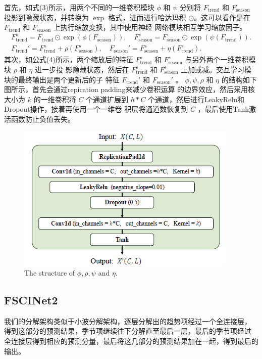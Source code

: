 \documentclass[twoside,a4paper]{article}
\begin{document}
\begin{CJK*}{UTF8}{gkai}
首先，如式(3)所示，用两个不同的一维卷积模块 $\phi$ 和 $\psi$ 分别将
$F_{\text{trend}}$ 和 $F_{\text{season}}$ 投影到隐藏状态，并转换为
$\exp$ 格式，进而进行哈达玛积 $\odot$。这可以看作是在
$F_{\text{trend}}$ 和 $F_{\text{season}}$ 上执行缩放变换，其中使用神经
网络模块相互学习缩放因子。
\begin{gather}
  F_{\text{trend}}^s=F_{\text{trend}}\odot \exp(\phi(F_{\text{season}})),\quad F_{\text{season}}^s=F_{\text{season}}\odot \exp(\psi(F_{\text{trend}})).\\
F_{\text{trend}}'=F_{\text{trend}}^s+\rho(F_{\text{season}}^s),\quad F_{\text{season}}'=F_{\text{season}}^s+\eta(F_{\text{trend}}^s).
\end{gather}
其次，如公式(4)所示，两个缩放后的特征 $F_{\text{trend}}^s$ 和
$F_{\text{season}}^s$ 与另外两个一维卷积模块 $\rho$ 和 $\eta$ 进一步投
影隐藏状态，然后在 $F_{\text{trend}}^s$ 和
$F_{\text{season}}^s$ 上加或减。交互学习模块的最终输出是两个更新后的子
特征 $F_{\text{trend}}'$ 和 $F_{\text{season}}'$ 。 $\phi ,\psi,\rho$
和 $\eta$ 的结构如下图所示，首先会通过repication padding来减少卷积运算
的边界效应，然后采用核大小为 $k$ 的一维卷积将 $C$ 个通道扩展到
$h\ast C$ 个通道，然后进行LeakyRelu和Dropout操作，接着再使用一个一维卷
积层将通道数恢复到 $C$ ，最后使用Tanh激活函数防止负值丢失。

  \begin{figure}[ht]
\centering
\includegraphics[scale=0.45]{pics/SCINet_p.png}
\caption{The structure of $\phi,\rho,\psi$ and $\eta$.}
\end{figure}

\subsection{FSCINet2}
我们的分解架构类似于小波分解架构，逐层分解出的趋势项经过一个全连接层，
得到这部分的预测结果，季节项继续往下分解直至最后一层，最后的季节项经过
全连接层得到相应的预测分量，最后将这几部分的预测结果加在一起，得到最后的输出。


\end{CJK*}
\end{document}
